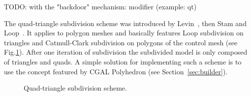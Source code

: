 TODO: with the "backdoor" mechanism: modifier (example: qt) 

The quad-triangle subdivision scheme was introduced by
Levin~\cite{l-pg-03}, then Stam and Loop~\cite{sl-qts-02}. It applies
to polygon meshes and basically features Loop subdivision on triangles
and Catmull-Clark subdivision on polygons of the control mesh (see
Fig.\ref{fig:quad-triangle}). After one iteration of subdivision the
subdivided model is only composed of triangles and quads. A simple
solution for implementing such a scheme is to use the
 concept featured by CGAL 
Polyhedron (see Section~\ref{sec:builder}).

\begin{figure}
    \caption{Quad-triangle subdivision scheme.}
    \label{fig:quad-triangle}
\end{figure}
